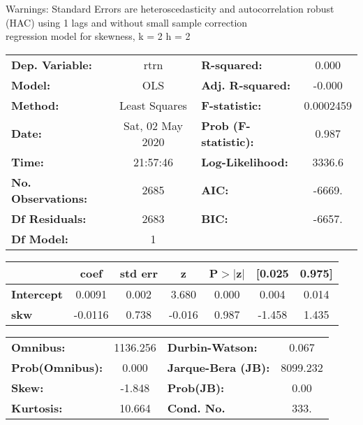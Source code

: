 Warnings: \newline
 [1] Standard Errors are heteroscedasticity and autocorrelation robust (HAC) using 1 lags and without small sample correction\\ 

regression model for skewness, k = 2 h = 2\begin{center}
\begin{tabular}{lclc}
\toprule
\textbf{Dep. Variable:}    &       rtrn       & \textbf{  R-squared:         } &     0.000   \\
\textbf{Model:}            &       OLS        & \textbf{  Adj. R-squared:    } &    -0.000   \\
\textbf{Method:}           &  Least Squares   & \textbf{  F-statistic:       } & 0.0002459   \\
\textbf{Date:}             & Sat, 02 May 2020 & \textbf{  Prob (F-statistic):} &    0.987    \\
\textbf{Time:}             &     21:57:46     & \textbf{  Log-Likelihood:    } &    3336.6   \\
\textbf{No. Observations:} &        2685      & \textbf{  AIC:               } &    -6669.   \\
\textbf{Df Residuals:}     &        2683      & \textbf{  BIC:               } &    -6657.   \\
\textbf{Df Model:}         &           1      & \textbf{                     } &             \\
\bottomrule
\end{tabular}
\begin{tabular}{lcccccc}
                   & \textbf{coef} & \textbf{std err} & \textbf{z} & \textbf{P$> |$z$|$} & \textbf{[0.025} & \textbf{0.975]}  \\
\midrule
\textbf{Intercept} &       0.0091  &        0.002     &     3.680  &         0.000        &        0.004    &        0.014     \\
\textbf{skw}       &      -0.0116  &        0.738     &    -0.016  &         0.987        &       -1.458    &        1.435     \\
\bottomrule
\end{tabular}
\begin{tabular}{lclc}
\textbf{Omnibus:}       & 1136.256 & \textbf{  Durbin-Watson:     } &    0.067  \\
\textbf{Prob(Omnibus):} &   0.000  & \textbf{  Jarque-Bera (JB):  } & 8099.232  \\
\textbf{Skew:}          &  -1.848  & \textbf{  Prob(JB):          } &     0.00  \\
\textbf{Kurtosis:}      &  10.664  & \textbf{  Cond. No.          } &     333.  \\
\bottomrule
\end{tabular}
\end{center}

